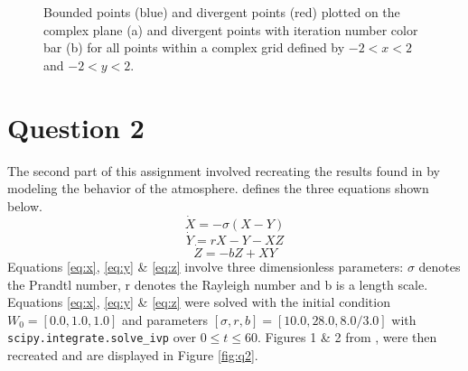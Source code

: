 \documentclass[10pt, preprint]{aastex}
\begin{document}
\begin{figure}[H]
  \centering
  \hfill
    \hfill
  \caption{ Bounded points (blue) and divergent points (red) plotted on the complex plane (a) and divergent points with iteration number color bar (b) for all points within a complex grid defined by $-2<x<2$ and $-2<y<2$. \label{fig:q1}}
\end{figure}

\section{Question 2}
The second part of this assignment involved recreating the results found in \cite{Lorenz} by modeling the behavior of the atmosphere. \cite{Lorenz} defines the three equations shown below.
\begin{equation}\label{eq:x}
    \dot{X} = -\sigma(X-Y)
\end{equation}
\begin{equation}\label{eq:y}
    \dot{Y} = rX - Y - XZ
\end{equation}
\begin{equation}\label{eq:z}
    \dot{Z} = -bZ +XY
\end{equation}
Equations \ref{eq:x}, \ref{eq:y} \& \ref{eq:z} involve three dimensionless parameters: $\sigma$ denotes the Prandtl number, r denotes the Rayleigh number and b is a length scale. Equations \ref{eq:x}, \ref{eq:y} \& \ref{eq:z} were solved with the initial condition $W_0 = [0.0,1.0,1.0]$ and parameters $[\sigma,r,b] = [10.0,28.0,8.0/3.0]$ with \texttt{scipy.integrate.solve\_ivp} over $0\le t \le60$. Figures 1 \& 2 from \cite{Lorenz}, were then recreated and are displayed in Figure \ref{fig:q2}. 
\end{document}
